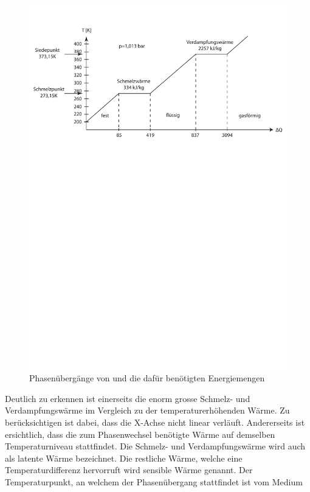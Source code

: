 \documentclass[11pt,a4paper]{scrartcl}
\begin{document}
\begin{figure}[h]
\begin{center}
\includegraphics[scale=0.6]{images/Phasendiagramm.pdf}
\caption{Phasenübergänge von  und die dafür benötigten Energiemengen}
\label{fig:H2O}
\end{center}
\end{figure}
Deutlich zu erkennen ist einerseits die enorm grosse Schmelz- und
Verdampfungswärme im Vergleich zu der temperaturerhöhenden Wärme. Zu
berücksichtigen ist dabei, dass die X-Achse nicht linear verläuft. Andererseits
ist ersichtlich, dass die zum Phasenwechsel benötigte Wärme auf demselben
Temperaturniveau stattfindet. Die Schmelz- und Verdampfungswärme wird auch als
latente Wärme bezeichnet. Die restliche Wärme, welche eine Temperaturdifferenz
hervorruft wird sensible Wärme genannt.
Der Temperaturpunkt, an welchem der Phasenübergang stattfindet ist vom Medium
\end{document}
